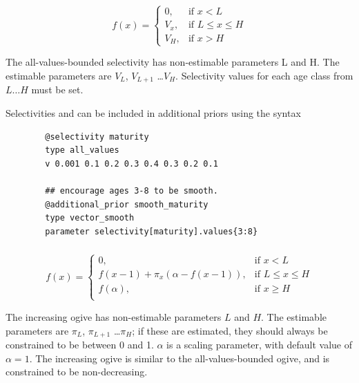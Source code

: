 \subsubsection[All-values-bounded]{}\label{sec:Selectivity-AllValuesBounded}

\begin{equation}
f(x)=\begin{cases}
		 0, & \text{if $x < L$} \\
		 V_x, & \text{if $L \le x \le H$} \\
		 V_H, & \text{if $x > H$}
  \end{cases}
\end{equation}

The all-values-bounded selectivity has non-estimable parameters L and H. The estimable parameters are $V_L$, $V_{L+1}$ \ldots $V_H$. Selectivity values for each age class from $L \ldots H$ must be set.

Selectivities  and  can be included in additional priors using the syntax

{\small{\begin{verbatim}
		@selectivity maturity
		type all_values
		v 0.001 0.1 0.2 0.3 0.4 0.3 0.2 0.1

		## encourage ages 3-8 to be smooth.
		@additional_prior smooth_maturity
		type vector_smooth
		parameter selectivity[maturity].values{3:8}

		\end{verbatim}}}

\subsubsection[Increasing ]{} \label{sec:Selectivity-Increasing}

\begin{equation}
f(x)=\begin{cases}
	  0, & \text{if $x < L$} \\
	  f(x-1)+ \pi_x(\alpha-f(x-1)), & \text{if $L \le x \le H$} \\
	  f(\alpha), & \text{if $x \ge H$} \\
  \end{cases}
\end{equation}

The increasing ogive has non-estimable parameters $L$ and $H$. The estimable parameters are $\pi_L$, $\pi_{L+1}$ \ldots $\pi_H$; if these are estimated, they should always be constrained to be between 0 and 1. $\alpha$ is a scaling parameter, with default value of $\alpha = 1$. The increasing ogive is similar to the all-values-bounded ogive, and is constrained to be non-decreasing.

